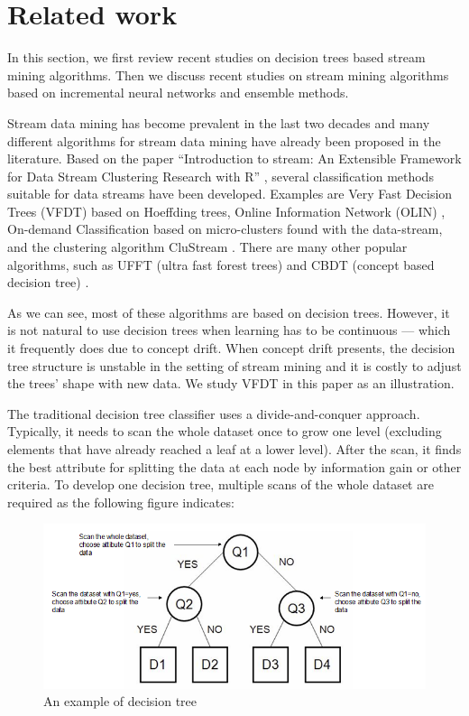 \documentclass[conference]{IEEEtran}
\begin{document}
		\section{Related work}
		\label{sec:related-work}
		In this section, we first review recent studies on decision trees based stream mining algorithms. Then we discuss recent studies on stream mining algorithms based on incremental neural networks and ensemble methods. 
		
		Stream data mining has become prevalent in the last two decades and many different algorithms for stream data mining have already been proposed in the literature. Based on the paper ``Introduction to stream: An Extensible Framework for Data Stream Clustering Research with R'' \cite{Rstream}, several classification methods suitable for data streams have been developed. Examples are Very Fast Decision Trees (VFDT) \cite{VFDT} based on Hoeffding trees, Online Information Network (OLIN)  \cite{last}, On-demand Classification \cite{Aggarwal04} based on micro-clusters found with the data-stream, and the clustering algorithm CluStream \cite{ggarwal03}. There are many other popular algorithms, such as UFFT (ultra fast forest trees) \cite{gama} and CBDT (concept based decision tree) \cite{CBDT}.
		
		As we can see, most of these algorithms are based on decision trees. However, it is not natural to use decision trees when learning has to be continuous --- which it frequently does due to concept drift. When concept drift presents, the decision tree structure is unstable in the setting of stream mining and it is costly to adjust the trees' shape with new data. We study VFDT in this paper as an illustration.
		
		The traditional decision tree classifier uses a divide-and-conquer approach. Typically, it needs to scan the whole dataset once to grow one level (excluding elements that have already reached a leaf at a lower level). After the scan, it finds the best attribute for splitting the data at each node by information gain or other criteria. To develop one decision tree, multiple scans of the whole dataset are required as the following figure indicates:
		\begin{figure}[H]
			\centering
			\includegraphics[width=\linewidth]{figures/decision_tree}
			\caption{An example of decision tree}
			\label{fig:tree}
		\end{figure}
		
\end{document}
